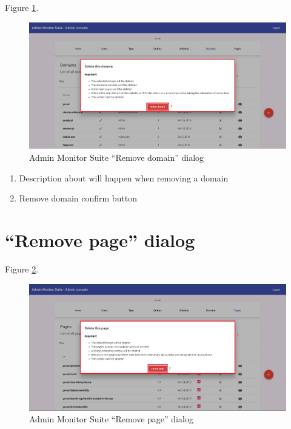 Figure \ref{fig:admin_remove_domain_dialog}.

\begin{figure}[H]
    \centering
    \includegraphics[width=\linewidth]{lib/images/admin/admin_remove_domain_dialog.png}
    \caption{Admin Monitor Suite ``Remove domain'' dialog}
    \label{fig:admin_remove_domain_dialog}
\end{figure}

\begin{enumerate}
    \item Description about will happen when removing a domain
    \item Remove domain confirm button
\end{enumerate}

\section{``Remove page'' dialog}
\label{sec:admin_remove_page_dialog}

Figure \ref{fig:admin_remove_page_dialog}.

\begin{figure}[H]
    \centering
    \includegraphics[width=\linewidth]{lib/images/admin/admin_remove_page_dialog.png}
    \caption{Admin Monitor Suite ``Remove page'' dialog}
    \label{fig:admin_remove_page_dialog}
\end{figure}

